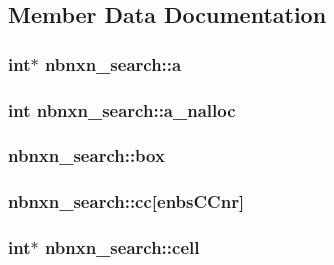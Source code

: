 \subsection{\-Member \-Data \-Documentation}
\hypertarget{structnbnxn__search_a091b9827a5a8652fb3c58bc5cfc6267c}{
\subsubsection[{a}]{\setlength{\rightskip}{0pt plus 5cm}int$\ast$ {\bf nbnxn\-\_\-search\-::a}}}\label{structnbnxn__search_a091b9827a5a8652fb3c58bc5cfc6267c}
\hypertarget{structnbnxn__search_a6025f60a2cde95ee95e8d81469d9061a}{
\subsubsection[{a\-\_\-nalloc}]{\setlength{\rightskip}{0pt plus 5cm}int {\bf nbnxn\-\_\-search\-::a\-\_\-nalloc}}}\label{structnbnxn__search_a6025f60a2cde95ee95e8d81469d9061a}
\hypertarget{structnbnxn__search_aaa50e6611ffa535f88030ec536196741}{
\subsubsection[{box}]{ {\bf nbnxn\-\_\-search\-::box}}}\label{structnbnxn__search_aaa50e6611ffa535f88030ec536196741}
\hypertarget{structnbnxn__search_acd408a71799ef8d8c066f1e78ced0c51}{
\subsubsection[{cc}]{ {\bf nbnxn\-\_\-search\-::cc}\mbox{[}{\bf enbs\-C\-Cnr}\mbox{]}}}\label{structnbnxn__search_acd408a71799ef8d8c066f1e78ced0c51}
\hypertarget{structnbnxn__search_a69030c2000d8286be45c4f6b82bad057}{
\subsubsection[{cell}]{\setlength{\rightskip}{0pt plus 5cm}int$\ast$ {\bf nbnxn\-\_\-search\-::cell}}}\label{structnbnxn__search_a69030c2000d8286be45c4f6b82bad057}
